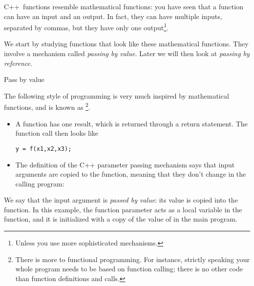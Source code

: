 
C++~functions resemble mathematical functions: you have seen that a
function can have an input and an output. In fact, they can have
multiple inputs, separated by commas, but they have only one
output\footnote{Unless you use more sophisticated mechanisms.}.

We start by studying functions that look like these mathematical
functions. They involve a  mechanism
called
\emph{passing by value}.
%
Later we will then look at
\emph{passing by reference}.

 {Pass by value}

The following style of programming is very much inspired by
mathematical functions, and is known as \footnote {There is more to functional programming. For
  instance, strictly speaking your whole program needs to be based on
  function calling; there is no other code than function definitions
  and calls.}.
\begin{itemize}
\item A function has one result, which is returned through a return
  statement. The function call then looks like
\begin{lstlisting}
y = f(x1,x2,x3);
\end{lstlisting}
\item The definition of the C++ parameter passing mechanism says that
  input arguments are copied to the function, meaning that they don't
  change in the calling program:

\end{itemize}

We say that the input argument is \emph{passed by
  value}: its value is copied into the
function.  In this example, the function parameter  acts as a
local variable in the function, and it is initialized with a copy of
the value of  in the main program.


